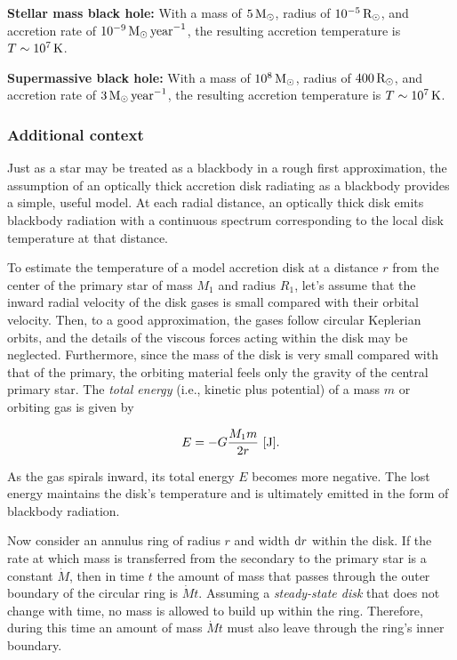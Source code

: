 \documentclass[a4paper,10pt]{article}
\begin{document}
{\noindent}\textbf{Stellar mass black hole:} With a mass of $5\,{\rm M_\odot}$, radius of $10^{-5}\,{\rm R_\odot}$, and accretion rate of $10^{-9}\,{\rm M_\odot\,year}^{-1}$, the resulting accretion temperature is $T\sim10^7\,{\rm K}$.

{\noindent}\textbf{Supermassive black hole:} With a mass of $10^8\,{\rm M_\odot}$, radius of $400\,{\rm R_\odot}$, and accretion rate of $3\,{\rm M_\odot\,year}^{-1}$, the resulting accretion temperature is $T\sim10^7\,{\rm K}$.

\subsubsection{Additional context}

Just as a star may be treated as a blackbody in a rough first approximation, the assumption of an optically thick accretion disk radiating as a blackbody provides a simple, useful model. At each radial distance, an optically thick disk emits blackbody radiation with a continuous spectrum corresponding to the local disk temperature at that distance.

{\noindent}To estimate the temperature of a model accretion disk at a distance $r$ from the center of the primary star of mass $M_1$ and radius $R_1$, let's assume that the inward radial velocity of the disk gases is small compared with their orbital velocity. Then, to a good approximation, the gases follow circular Keplerian orbits, and the details of the viscous forces acting within the disk may be neglected. Furthermore, since the mass of the disk is very small compared with that of the primary, the orbiting material feels only the gravity of the central primary star. The \textit{total energy} (i.e., kinetic plus potential) of a mass $m$ or orbiting gas is given by

\begin{align*}
E = -G\frac{M_1m}{2r} ~ [{\rm J}].
\end{align*}

{\noindent}As the gas spirals inward, its total energy $E$ becomes more negative. The lost energy maintains the disk's temperature and is ultimately emitted in the form of blackbody radiation.

{\noindent}Now consider an annulus ring of radius $r$ and width ${\rm d}r$ within the disk. If the rate at which mass is transferred from the secondary to the primary star is a constant $\dot{M}$, then in time $t$ the amount of mass that passes through the outer boundary of the circular ring is $\dot{M}t$. Assuming a \textit{steady-state disk} that does not change with time, no mass is allowed to build up within the ring. Therefore, during this time an amount of mass $\dot{M}t$ must also leave through the ring's inner boundary.
\end{document}
